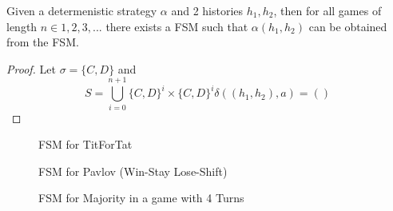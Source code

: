 \begin{theorem}\label{thm:fsm}
Given a determenistic strategy $\alpha$ and 2 histories $h_1, h_2$, then for all games of length $n \in 1,2,3,...$ there exists a FSM such that $\alpha(h_1, h_2)$ can be obtained from the FSM.
\end{theorem}

\begin{proof}\label{prf:fsm}
Let $\sigma = \{C, D\}$ and
\[
S = \bigcup_{i=0}^{n+1} \{C, D\}^i \times \{C, D\}^i
\delta((h_1, h_2), a) =()
\]

\end{proof}




\begin{figure}[!hbtp]
    \begin{center}
        
        \caption{FSM for TitForTat}\label{fig:Tit4TatFSM}
        
        \caption{FSM for Pavlov (Win-Stay Lose-Shift)}\label{fig:PavlovFSM}
    \end{center}
\end{figure}

\begin{figure}[!hbtp]
    \begin{center}
        
        \caption{FSM for Majority in a game with 4 Turns}\label{fig:MajorityFSM}
    \end{center}
\end{figure}


